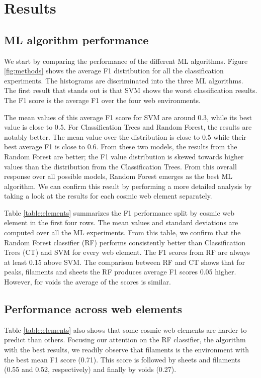 \documentclass[usenatbib]{mnras}
\begin{document}
\section{Results}\label{sec:results}


\subsection{ML algorithm performance}


We start by comparing the performance of the different ML algorithms.
Figure \ref{fig:methods} shows the average F1 distribution for
all the classification experiments. 
The histograms are discriminated into the three ML algorithms.
The first result that stands out is that SVM shows the worst
classification results.
The F1 score is the average F1 over the four web environments.

The mean values of this average F1 score for SVM are around 0.3, while its best
value is close to 0.5.
For Classification Trees and Random Forest, the results are notably better.
The mean value over the distribution is close to 0.5 while their best
average F1 is close to 0.6.
From these two models, the results from the Random Forest are
better; the F1 value distribution is skewed towards higher values than
the distribution from the Classification Trees.
From this overall response over all possible models, Random Forest
emerges as the best ML algorithm.
We can confirm this result by performing a more detailed analysis by
taking a look at the results for each cosmic web element separately.


Table \ref{table:elements} summarizes the F1 performance split by cosmic
web element in the first four rows.
The mean values and standard deviations are computed over all the ML
experiments. 
From this table, we confirm that the Random Forest classifier (RF) performs
consistently better than Classification Trees (CT) and SVM for every web element.
The F1 scores from RF are always at least 0.15 above SVM.
The comparison between RF and CT shows that for peaks, filaments and
sheets the RF produces average F1 scores 0.05 higher. 
However, for voids the average of the scores is similar. 

\subsection{Performance across web elements}

Table \ref{table:elements} also shows that some cosmic web elements 
are harder to predict than others.
Focusing our attention on the RF classifier, the algorithm with the
best results, we readily observe that filaments is the environment
with the best mean F1 score (0.71).
This score is followed by sheets and filaments (0.55 and 0.52,
respectively) and finally by voids (0.27).
\end{document}
